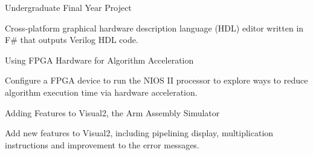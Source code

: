 \begin{cventries}
    \cventry
    {} %
    {Undergraduate Final Year Project} %
    {} %
    {} %
    {
      \begin{cvitems} %
        \item {Cross-platform graphical hardware description language (HDL) editor written in F\# that outputs Verilog HDL code.}
      \end{cvitems}
    }
    
    \cventry
    {} %
    {Using FPGA Hardware for Algorithm Acceleration} %
    {} %
    {} %
    {
      \begin{cvitems} %
        \item {Configure a FPGA device to run the NIOS II processor to explore ways to reduce algorithm execution time via hardware acceleration.}        
      \end{cvitems}
    }
    
    \cventry
    {} %
    {Adding Features to Visual2, the Arm Assembly Simulator} %
    {} %
    {} %
    {
      \begin{cvitems} %
        \item {Add new features to Visual2, including pipelining display, multiplication instructions and improvement to the error messages.}
      \end{cvitems}
    }
    

\end{cventries}